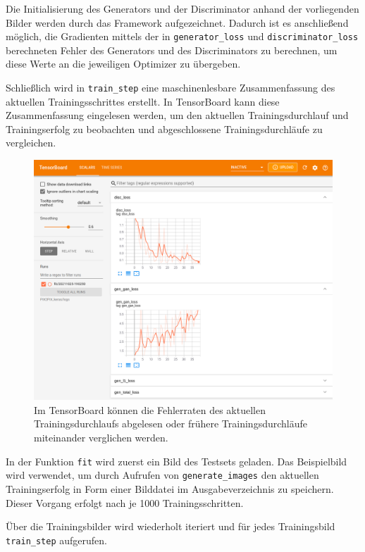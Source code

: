 Die Initialisierung des Generators und der Discriminator anhand der vorliegenden Bilder werden durch das Framework aufgezeichnet. Dadurch ist es anschließend möglich, die Gradienten mittels der in \lstinline|generator_loss| und \lstinline|discriminator_loss| berechneten Fehler des Generators und des Discriminators zu berechnen, um diese Werte an die jeweiligen Optimizer zu übergeben.

Schließlich wird in \lstinline|train_step| eine maschinenlesbare Zusammenfassung des aktuellen Trainingsschrittes erstellt. In TensorBoard kann diese Zusammenfassung eingelesen werden, um den aktuellen Trainingsdurchlauf und Trainingserfolg zu beobachten und abgeschlossene Trainingsdurchläufe zu vergleichen.

\begin{figure}[h]
	\centering
	\includegraphics[width=1.0\textwidth]{bilder/tensorboard.png}
	\caption[TensorBoard]{Im TensorBoard können die Fehlerraten des aktuellen Trainingsdurchlaufs abgelesen oder frühere Trainingsdurchläufe miteinander verglichen werden.}
	\label{fig:unsupervisedexamples}
\end{figure}

In der Funktion \lstinline|fit| wird zuerst ein Bild des Testsets geladen. Das Beispielbild wird verwendet, um durch Aufrufen von \lstinline|generate_images| den aktuellen Trainingserfolg in Form einer Bilddatei im Ausgabeverzeichnis zu speichern. Dieser Vorgang erfolgt nach je 1000 Trainingsschritten.

Über die Trainingsbilder wird wiederholt iteriert und für jedes Trainingsbild \lstinline|train_step| aufgerufen.

